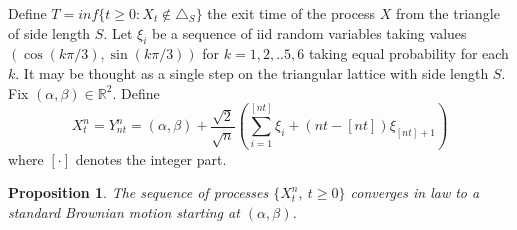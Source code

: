 \documentclass[11pt, a4paper, oneside]{report}
\numberwithin{equation}{section}
\newtheorem{proposition}[theorem]{Proposition}
\begin{document}
\noindent Define \(T=inf\{t \geq 0 : X_t \notin \triangle_S\}\) the exit time of the process \(X\) from the triangle of side length \(S\). Let \(\xi_i\) be a sequence of iid random variables taking values $(\cos(k\pi/3), \sin(k\pi/3))$ for \(k=1,2,..5,6\) taking equal probability for each \(k\). It may be thought as a single step on the triangular lattice with side length \(S\). Fix $(\alpha,\beta) \in \mathbb{R}^2$. Define
\begin{equation}
X^n_t=Y^n_{nt} = (\alpha, \beta) + \frac{\sqrt{2}}{\sqrt{n}} \left( \sum_{i=1}^{[nt]} \xi_i + (nt - [ nt])\xi_{[nt] + 1} \right)
\end{equation}
where \( [ \cdot ] \) denotes the integer part.
\begin{proposition}\label{process-convergence}\cite[Proposition 2]{research}
The sequence of processes \( \{X^n_t, \ t \geq 0\} \) converges in law to a standard Brownian motion starting at \( (\alpha, \beta) \).
\end{proposition}
\end{document}
